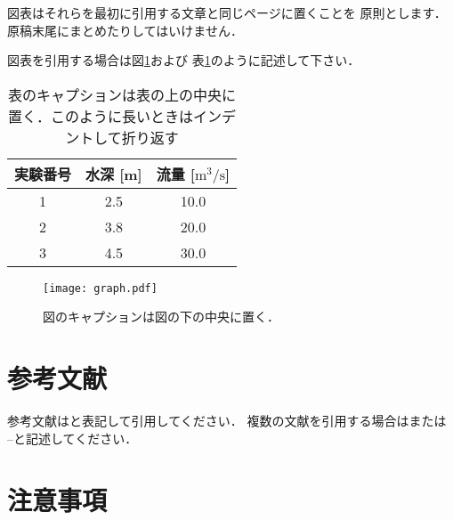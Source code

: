\documentclass[a4j,10pt]{jsarticle}
\begin{document}
図表はそれらを最初に引用する文章と同じページに置くことを
原則とします．原稿末尾にまとめたりしてはいけません．

図表を引用する場合は図\ref{fig:sample}および
表\ref{table:sample}のように記述して下さい．

\begin{table}[t]
  \centering
  \caption{表のキャプションは表の上の中央に置く．このように長いときはインデントして折り返す}
  \label{table:sample}
  \vspace{0pt} %
  \begin{tabular}{|c|c|c|} \hline
    実験番号 & 水深 [m] & 流量 [$\mathrm{m}^3/\mathrm{s}$] \\ \hline
    1 & 2.5 & 10.0 \\ \hline
    2 & 3.8 & 20.0 \\ \hline
    3 & 4.5 & 30.0 \\ \hline
  \end{tabular}
  \vspace{10pt} %
\end{table}

\begin{figure}[t]
  \centering
  \vspace{0pt} %
  \texttt{[image: graph.pdf]}
  \vspace{0pt} %
  \caption{図のキャプションは図の下の中央に置く．}
  \vspace{0pt} %
  \label{fig:sample}
\end{figure}

\section{参考文献}

参考文献は\cite{sample1}と表記して引用してください．
複数の文献を引用する場合は\cite{sample1,sample2,sample3}または
\cite{sample1}--\cite{sample3}と記述してください．

\section{注意事項}
\end{document}
